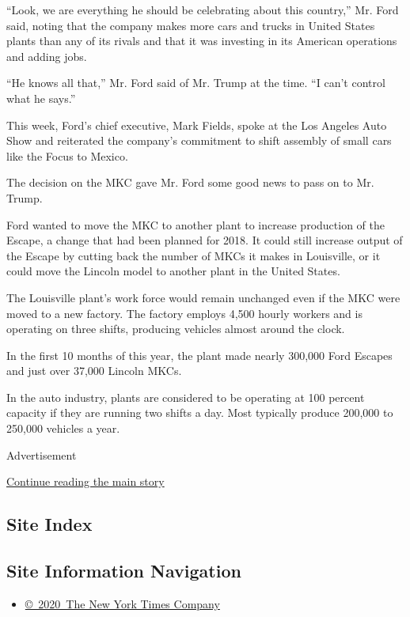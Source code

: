 ``Look, we are everything he should be celebrating about this country,''
Mr. Ford said, noting that the company makes more cars and trucks in
United States plants than any of its rivals and that it was investing in
its American operations and adding jobs.

``He knows all that,'' Mr. Ford said of Mr. Trump at the time. ``I can't
control what he says.''

This week, Ford's chief executive, Mark Fields, spoke at the Los Angeles
Auto Show and reiterated the company's commitment to shift assembly of
small cars like the Focus to Mexico.

The decision on the MKC gave Mr. Ford some good news to pass on to Mr.
Trump.

Ford wanted to move the MKC to another plant to increase production of
the Escape, a change that had been planned for 2018. It could still
increase output of the Escape by cutting back the number of MKCs it
makes in Louisville, or it could move the Lincoln model to another plant
in the United States.

The Louisville plant's work force would remain unchanged even if the MKC
were moved to a new factory. The factory employs 4,500 hourly workers
and is operating on three shifts, producing vehicles almost around the
clock.

In the first 10 months of this year, the plant made nearly 300,000 Ford
Escapes and just over 37,000 Lincoln MKCs.

In the auto industry, plants are considered to be operating at 100
percent capacity if they are running two shifts a day. Most typically
produce 200,000 to 250,000 vehicles a year.

Advertisement

\protect\hyperlink{after-bottom}{Continue reading the main story}

\hypertarget{site-index}{%
\subsection{Site Index}\label{site-index}}

\hypertarget{site-information-navigation}{%
\subsection{Site Information
Navigation}\label{site-information-navigation}}

\begin{itemize}
\tightlist
\item
  \href{https://help.nytimes.com/hc/en-us/articles/115014792127-Copyright-notice}{©~2020~The
  New York Times Company}
\end{itemize}

